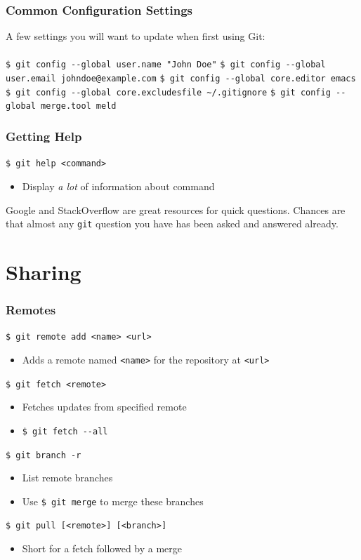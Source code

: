 \documentclass[english,compress]{beamer}
\begin{document}
\begin{frame}[fragile]
    \frametitle{Common Configuration Settings}
	A few settings you will want to update when first using Git:\\ \ \\
	\verb|$ git config --global user.name "John Doe"|
	\verb|$ git config --global user.email johndoe@example.com|
	\verb|$ git config --global core.editor emacs|
	\verb|$ git config --global core.excludesfile ~/.gitignore|
	\verb|$ git config --global merge.tool meld|
\end{frame}

\begin{frame}[fragile]
    \frametitle{Getting Help}

	\verb|$ git help <command>|
	\begin{itemize}
		\item Display \textit{a lot} of information about command
	\end{itemize}

    Google and StackOverflow are great resources for quick questions.
    Chances are that almost any \verb|git| question you have has been
    asked and answered already.

\end{frame}


\section{Sharing}
\begin{frame}[fragile]
    \frametitle{Remotes}

    \verb|$ git remote add <name> <url>|
    \begin{itemize}
        \item Adds a remote named \verb|<name>| for the repository at \verb|<url>|
    \end{itemize}

    \verb|$ git fetch <remote>|
    \begin{itemize}
        \item Fetches updates from specified remote
        \item \verb|$ git fetch --all|
    \end{itemize}

    \verb|$ git branch -r |
    \begin{itemize}
        \item List remote branches
        \item Use \verb|$ git merge| to merge these branches
    \end{itemize}

    \verb|$ git pull [<remote>] [<branch>]|
    \begin{itemize}
        \item Short for a fetch followed by a merge
    \end{itemize}
\end{frame}
\end{document}
